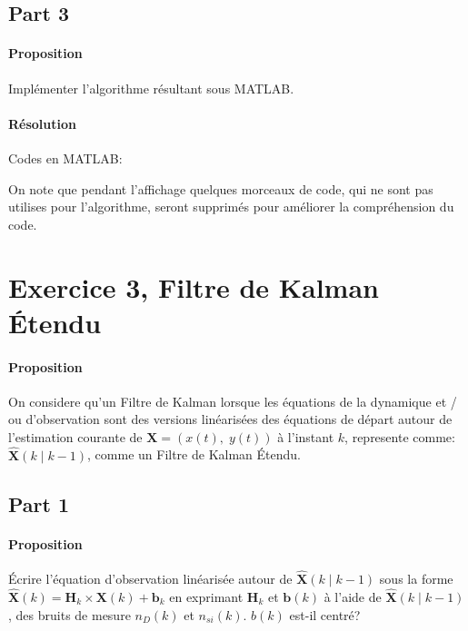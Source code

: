 \documentclass{article}
\begin{document}
\subsection{Part 3}
\paragraph{Proposition}Implémenter l'algorithme résultant sous MATLAB.

\paragraph{Résolution}Codes en MATLAB:
\begin{scriptsize}\mycode
    
    
\end{scriptsize}
On note que pendant l'affichage quelques morceaux de code, qui ne sont pas utilises pour l'algorithme, seront supprimés pour améliorer la compréhension du code.



\section{Exercice 3, Filtre de Kalman Étendu}
\paragraph{Proposition}On considere qu'un Filtre de Kalman lorsque les équations de la dynamique et / ou d'observation sont des versions linéarisées des équations de départ autour de l'estimation courante de $\mathbf{X} = (x(t),\; y(t))$ à l'instant $k$, represente comme: $\hat{\mathbf{X}} (k \; | \; k-1)$, comme un Filtre de Kalman Étendu.

\subsection{Part 1}
\paragraph{Proposition}Écrire l'équation d'observation linéarisée autour de $\hat{\mathbf{X}}(k \; | \; k-1)$ sous la forme $\hat{\mathbf{X}}(k) = \mathbf{H}_{k} \times \mathbf{X}(k) + \mathbf{b}_{k}$ en exprimant $\mathbf{H}_{k}$ et $\mathbf{b}(k)$ à l'aide de $\hat{\mathbf{X}} (k \; | \; k-1)$, des bruits de mesure $n_D(k)$ et $n_{si}(k)$. $b(k)$ est-il centré?
\end{document}
